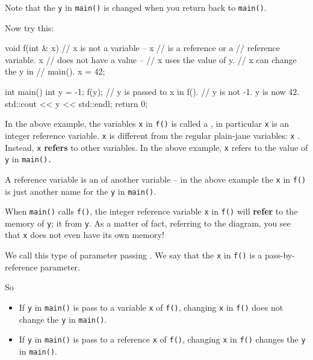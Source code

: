 Note that the \texttt{y} in \texttt{main()} is  changed when you return back to \texttt{main()}.

Now try this:

\begin{consolethree}[escapeinside=||]
void f(int & x) // x is not a variable -- x
                // is a reference or a
                // reference variable. x
                // does not have a value --
                // x uses the value of y.
                // x can change the y in
                // main().
{
    x = 42;
}

int main()
{
    int y = -1;
    f(y); // y is passed to x in f().
    // y is not -1. y is now 42.
    std::cout << y << std::endl;
    return 0;
}
\end{consolethree}

In the above example, the variables \texttt{x} in \texttt{f()} is called a , in particular \texttt{x} is an integer reference variable. \texttt{x} is different from the regular plain-jane variables: \texttt{x} . Instead, \texttt{x} \textbf{refers} to other variables. In the above example, \texttt{x} refers to the value of \texttt{y} in \texttt{main().}

A reference variable is an  of another variable -- in the above example the \texttt{x} in \texttt{f()} is just another name for the \texttt{y} in \texttt{main()}.

When \texttt{main()} calls \texttt{f()}, the integer reference variable \texttt{x} in \texttt{f()} will \textbf{refer} to the memory of \texttt{y}; it  from \texttt{y}. As a matter of fact, referring to the diagram, you see that \texttt{x} does not even have its own memory!

We call this type of parameter passing . We say that the \texttt{x} in \texttt{f()} is a pass-by-reference parameter.

So

\begin{itemize}
\item If \texttt{y} in \texttt{main()} is pass to a variable \texttt{x} of \texttt{f()}, changing \texttt{x} in \texttt{f()} does not change the \texttt{y} in \texttt{main()}.
\item If \texttt{y} in \texttt{main()} is pass to a reference \texttt{x} of \texttt{f()}, changing \texttt{x} in \texttt{f()} changes the \texttt{y} in \texttt{main()}.
\end{itemize}

